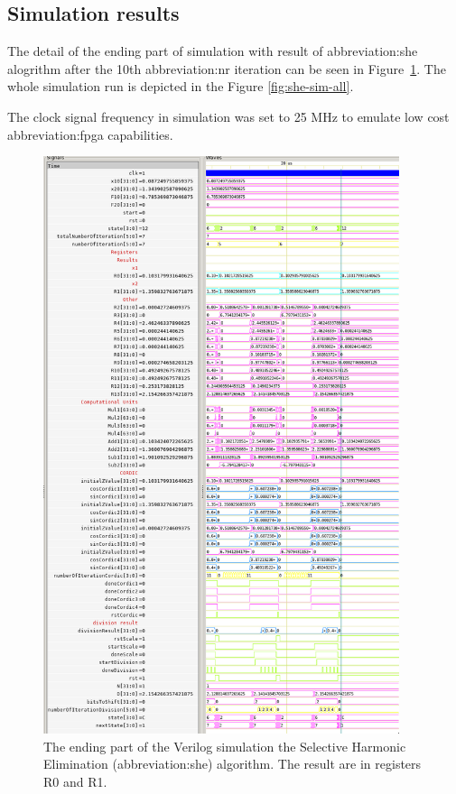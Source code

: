 \documentclass[a4paper, twoside, 11pt]{article}
\begin{document}
    \subsection{Simulation results}
        The detail of the ending part of simulation with result of \gls{abbreviation:she} alogrithm after the 10th \gls{abbreviation:nr} iteration can be seen in Figure~\ref{fig:she-sim-end}. The whole simulation run is depicted in the Figure \ref{fig:she-sim-all}.\par
        The clock signal frequency in simulation was set to 25 MHz to emulate low cost \gls{abbreviation:fpga} capabilities.
            \begin{figure}[htbp!]
                \centering
                \includegraphics[width=0.93\textwidth]{src/png/inverted/she-sim-end.png}
                \caption{The ending part of the Verilog simulation the Selective Harmonic Elimination (\gls{abbreviation:she}) algorithm. The result are in registers R0 and R1.}
                \label{fig:she-sim-end}
            \end{figure}
\end{document}
